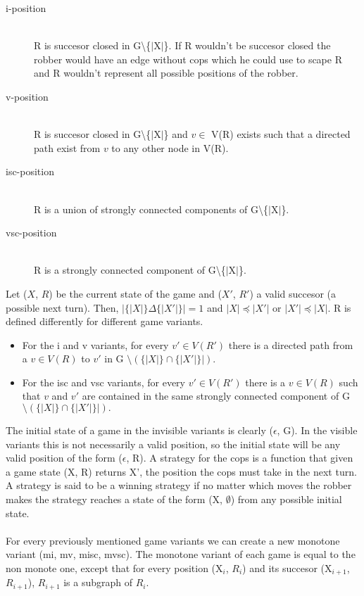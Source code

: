 \begin{description}
\item[i-position] \hfill \\
R is succesor closed in G\textbackslash \{$|$X$|$\}. If R wouldn't be succesor closed the robber would have an edge without cops which he could use to scape R and R wouldn't represent all possible positions of the robber.
\item[v-position] \hfill \\
R is succesor closed in G\textbackslash \{$|$X$|$\} and $v \in$ V(R) exists such that a directed path exist from $v$ to any other node in V(R).
\item[isc-position] \hfill \\
R is a union of strongly connected components of G\textbackslash \{$|$X$|$\}.
\item[vsc-position] \hfill \\
R is a strongly connected component of G\textbackslash \{$|$X$|$\}.
\end{description}

Let ($X$, $R$) be the current state of the game and ($X'$, $R'$) a valid succesor (a possible next turn). Then, $| \{|X|\} \Delta \{|X'|\}| = 1$ and $|X|\preceq |X'|$ or $|X'|\preceq |X|$. R is defined differently for different game variants.
\begin{itemize}
\item For the i and v variants, for every $v' \in V(R')$ there is a directed path from a $v \in V(R)$ to $v'$ in G $\setminus (\{|X|\} \cap \{|X'|\}|).$
\item For the isc and vsc variants, for every $v' \in V(R')$ there is a $v \in V(R)$ such that $v$ and $v'$ are contained in the same strongly connected component of G $\setminus (\{|X|\} \cap \{|X'|\}|).$
\end{itemize}

The initial state of a game in the invisible variants is clearly ($\epsilon$, G). In the visible variants this is not necessarily a valid position, so the initial state will be any valid position of the form ($\epsilon$, R). A strategy for the cops is a function that given a game state (X, R) returns X', the position the cops must take in the next turn. A strategy is said to be a winning strategy if no matter which moves the robber makes the strategy reaches a state of the form (X, $\emptyset$) from any possible initial state.

\paragraph{}
For every previously mentioned game variants we can create a new monotone variant (mi, mv, misc, mvsc). The monotone variant of each game is equal to the non monote one, except that for every position (X$_i$, $R_i$) and its succesor (X$_{i+1}$, $R_{i+1}$), $R_{i+1}$ is a subgraph of $R_i$. 


